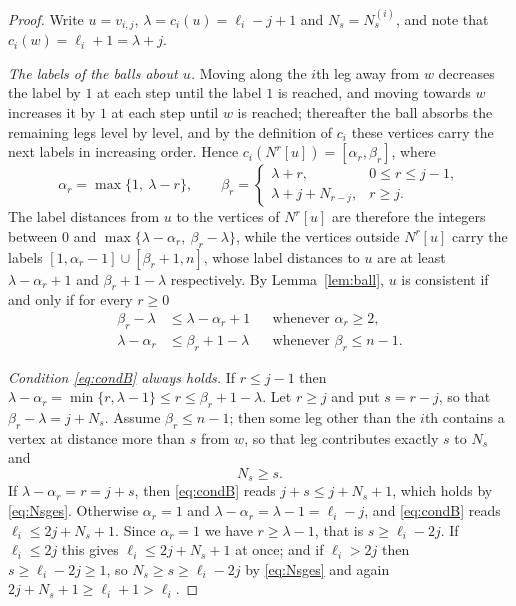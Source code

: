 \documentclass[reqno,10pt]{article}
\theoremstyle{definition}
\numberwithin{equation}{section}
\numberwithin{theorem}{section}
\newcommand{\Ball}[2]{N^{#2}[#1]}
\begin{document}
\begin{proof}
Write $u=v_{i,j}$, $\lambda=c_i(u)=\ell_i-j+1$ and $N_s=N^{(i)}_s$, and note
that $c_i(w)=\ell_i+1=\lambda+j$.

\smallskip
\noindent\emph{The labels of the balls about $u$.}
Moving along the $i$th leg away from $w$ decreases the label by $1$ at each step
until the label $1$ is reached, and moving towards $w$ increases it by $1$ at
each step until $w$ is reached; thereafter the ball absorbs the remaining legs
level by level, and by the definition of $c_i$ these vertices carry the next
labels in increasing order. Hence $c_i(\Ball{u}{r})=[\alpha_r,\beta_r]$, where
\[
  \alpha_r=\max\{1,\ \lambda-r\},
  \qquad
  \beta_r=\begin{cases}
    \lambda+r, & 0\le r\le j-1,\\
    \lambda+j+N_{r-j}, & r\ge j .
  \end{cases}
\]
The label distances from $u$ to the vertices of $\Ball{u}{r}$ are therefore the
integers between $0$ and $\max\{\lambda-\alpha_r,\ \beta_r-\lambda\}$, while the
vertices outside $\Ball{u}{r}$ carry the labels
$[1,\alpha_r-1]\cup[\beta_r+1,n]$, whose label distances to $u$ are at least
$\lambda-\alpha_r+1$ and $\beta_r+1-\lambda$ respectively. By
Lemma~\ref{lem:ball}, $u$ is consistent if and only if for every $r\ge0$
\begin{align}
  \beta_r-\lambda &\le \lambda-\alpha_r+1 &&\text{whenever } \alpha_r\ge2,
  \label{eq:condA}\\
  \lambda-\alpha_r &\le \beta_r+1-\lambda &&\text{whenever } \beta_r\le n-1 .
  \label{eq:condB}
\end{align}

\smallskip
\noindent\emph{Condition \eqref{eq:condB} always holds.}
If $r\le j-1$ then $\lambda-\alpha_r=\min\{r,\lambda-1\}\le r\le
\beta_r+1-\lambda$. Let $r\ge j$ and put $s=r-j$, so that
$\beta_r-\lambda=j+N_s$. Assume $\beta_r\le n-1$; then some leg other than the
$i$th contains a vertex at distance more than $s$ from $w$, so that leg
contributes exactly $s$ to $N_s$ and
\begin{equation}
  N_s\ge s .
  \label{eq:Nsges}
\end{equation}
If $\lambda-\alpha_r=r=j+s$, then \eqref{eq:condB} reads $j+s\le j+N_s+1$, which
holds by \eqref{eq:Nsges}. Otherwise $\alpha_r=1$ and
$\lambda-\alpha_r=\lambda-1=\ell_i-j$, and \eqref{eq:condB} reads
$\ell_i\le 2j+N_s+1$. Since $\alpha_r=1$ we have $r\ge \lambda-1$, that is
$s\ge \ell_i-2j$. If $\ell_i\le 2j$ this gives $\ell_i\le 2j+N_s+1$ at once;
and if $\ell_i>2j$ then $s\ge \ell_i-2j\ge1$, so $N_s\ge s\ge\ell_i-2j$ by
\eqref{eq:Nsges} and again $2j+N_s+1\ge \ell_i+1>\ell_i$.


\end{proof}
\end{document}
